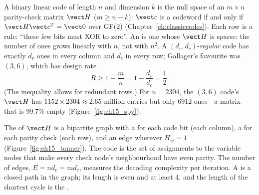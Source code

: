 A binary linear code of length $n$ and dimension $k$ is the null space of an $m\times n$
parity-check matrix $\vect H$ ($m\ge n-k$): $\vect c$ is a codeword if and only if $\vect H\vect c^T=\vect 0$
over GF(2) (Chapter~\ref{ch:classiccodes}). Each row is a rule: ``these few bits must XOR to zero''.
An  is one whose $\vect H$ is sparse: the number of ones grows linearly with $n$, not
with $n^2$. A $(d_v,d_c)$-\emph{regular} code has exactly $d_v$ ones in every column and $d_c$ in
every row; Gallager's favourite was $(3,6)$, which has design rate
\begin{equation}
R\ge1-\frac{m}{n}=1-\frac{d_v}{d_c}=\frac12.
\end{equation}
(The inequality allows for redundant rows.) For $n=2304$, the $(3,6)$ code's $\vect H$ has
$1152\times2304\approx2.65$ million entries but only 6912 ones---a matrix that is 99.7\% empty
(Figure~\ref{fig:ch15_spy}).

The  of $\vect H$ is a bipartite graph with a  for each
code bit (each column), a  for each parity check (each row), and an edge wherever
$H_{ij}=1$ (Figure~\ref{fig:ch15_tanner}). The code is the set of assignments to the variable nodes
that make every check node's neighbourhood have even parity. The number of edges, $E=nd_v=md_c$,
measures the decoding complexity per iteration. A  is a closed path in the graph; its
length is even and at least 4, and the length of the shortest cycle is the .

